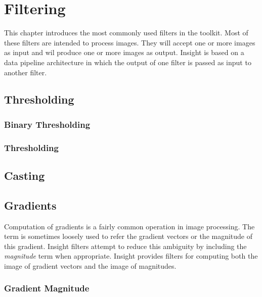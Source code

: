 \chapter{Filtering}

This chapter introduces the most commonly used filters in the toolkit.  Most of
these filters are intended to process images. They will accept one or more
images as input and wil produce one or more images as output. Insight is based
on a data pipeline architecture in which the output of one filter is passed as
input to another filter.


\section{Thresholding}
\label{sec:ThresholdingFiltering}

\subsection{Binary Thresholding}
\label{sec:BinaryThresholdingImageFilter}



\subsection{Thresholding}
\label{sec:ThresholdingImageFilter}





\section{Casting}
\label{sec:CastingFiltering}




\section{Gradients}
\label{sec:GradientFiltering}

Computation of gradients is a fairly common operation in image processing. The
term is sometimes loosely used to refer the gradient vectors or the magnitude
of this gradient. Insight filters attempt to reduce this ambiguity by including
the \emph{magnitude} term when appropriate. Insight provides filters for
computing both the image of gradient vectors and the image of magnitudes.

\subsection{Gradient Magnitude}
\label{sec:GradientMagnitudeImageFilter}

